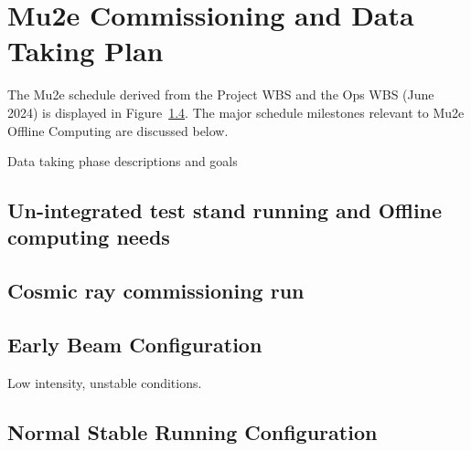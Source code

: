 \section{Mu2e Commissioning and Data Taking Plan}

The Mu2e schedule derived from the Project WBS and the Ops WBS (June 2024) is displayed in Figure~\ref{}. The major schedule milestones relevant to Mu2e Offline Computing are discussed below.


\label{sec:runplan}
Data taking phase descriptions and goals
\subsection{Un-integrated test stand running and Offline computing needs}
\subsection{Cosmic ray commissioning run}

\subsection{Early Beam Configuration}
Low intensity, unstable conditions.



\subsection{Normal Stable Running Configuration}

